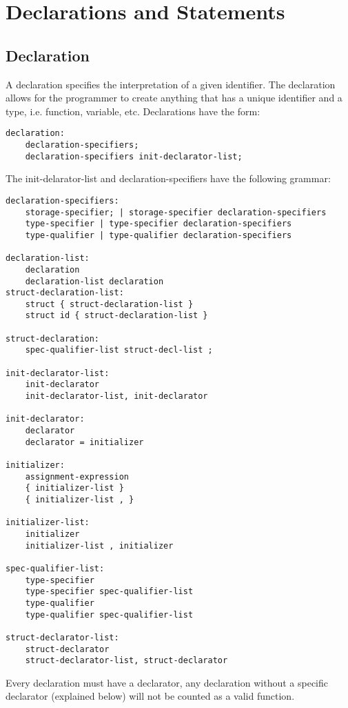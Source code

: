 \documentclass[./LRM_main.tex]{subfiles}
\begin{document}


\chapter{Declarations and Statements}
\section{Declaration}
A declaration specifies the interpretation of a given identifier. The declaration allows for the programmer to create anything that has a unique identifier and a type, i.e. function, variable, etc. Declarations have the form:
\begin{lstlisting}
declaration:
	declaration-specifiers;
	declaration-specifiers init-declarator-list;
\end{lstlisting}
The init-delarator-list and declaration-specifiers have the following grammar:
\begin{lstlisting}
declaration-specifiers:
	storage-specifier; | storage-specifier declaration-specifiers
	type-specifier | type-specifier declaration-specifiers
	type-qualifier | type-qualifier declaration-specifiers
	
declaration-list:
	declaration
	declaration-list declaration
struct-declaration-list:
	struct { struct-declaration-list }
	struct id { struct-declaration-list }

struct-declaration:
	spec-qualifier-list struct-decl-list ;

init-declarator-list:
	init-declarator
	init-declarator-list, init-declarator
	
init-declarator:
	declarator
	declarator = initializer

initializer:
	assignment-expression
	{ initializer-list }
	{ initializer-list , }

initializer-list:
	initializer
	initializer-list , initializer

spec-qualifier-list:
	type-specifier
	type-specifier spec-qualifier-list
	type-qualifier
	type-qualifier spec-qualifier-list

struct-declarator-list:
	struct-declarator
	struct-declarator-list, struct-declarator
\end{lstlisting}
Every declaration must have a declarator, any declaration without a specific declarator (explained below) will not be counted as a valid function.
\end{document}
